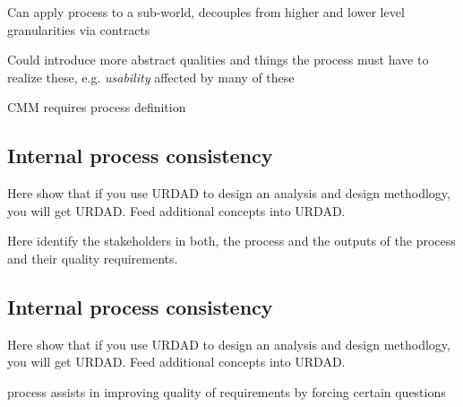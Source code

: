 Can apply process to a sub-world, decouples from higher and lower level granularities via contracts

Could introduce more abstract qualities and things the process must have to realize these, e.g. \emph{usability} affected by many of these

CMM requires process definition


\subsection{Internal process consistency}


Here show that if you use URDAD to design an analysis and design methodlogy, you will get URDAD. Feed additional concepts into URDAD.

Here identify the stakeholders in both, the process and the outputs of the process and their quality requirements.


\subsection{Internal process consistency}

Here show that if you use URDAD to design an analysis and design methodlogy, you will get URDAD. Feed additional concepts into URDAD.

process assists in improving quality of requirements by forcing certain questions
